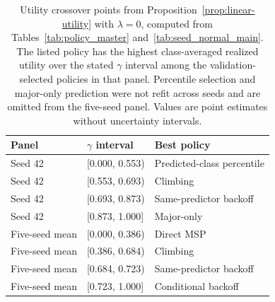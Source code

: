 \begin{table}[pos=htbp]
\centering\footnotesize
\caption{Utility crossover points from Proposition~\ref{prop:linear-utility} with $\lambda=0$, computed from Tables~\ref{tab:policy_master} and~\ref{tab:seed_normal_main}. The listed policy has the highest class-averaged realized utility over the stated $\gamma$ interval among the validation-selected policies in that panel. Percentile selection and major-only prediction were not refit across seeds and are omitted from the five-seed panel. Values are point estimates without uncertainty intervals.}
\label{tab:utility-crossovers}
\begin{tabular}{lll}
\toprule
Panel & $\gamma$ interval & Best policy \\
\midrule
Seed 42 & [0.000, 0.553) & Predicted-class percentile \\
Seed 42 & [0.553, 0.693) & Climbing \\
Seed 42 & [0.693, 0.873) & Same-predictor backoff \\
Seed 42 & [0.873, 1.000] & Major-only \\
\midrule
Five-seed mean & [0.000, 0.386) & Direct MSP \\
Five-seed mean & [0.386, 0.684) & Climbing \\
Five-seed mean & [0.684, 0.723) & Same-predictor backoff \\
Five-seed mean & [0.723, 1.000] & Conditional backoff \\
\bottomrule
\end{tabular}
\end{table}

